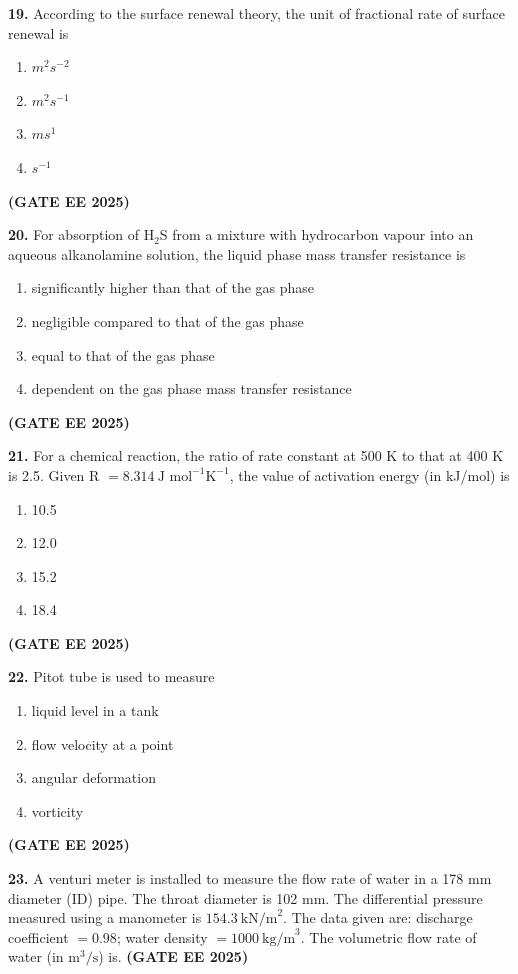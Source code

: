 \documentclass[journal,12pt,onecolumn]{IEEEtran}
\newcommand{\brak}[1]{(#1)}
\begin{document}
\noindent\textbf{19.} According to the surface renewal theory, the unit of fractional rate of surface renewal is
\begin{enumerate}
    \item $m^{2}s^{-2}$
    \item $m^{2}s^{-1}$
    \item $ms^{1}$
    \item $s^{-1}$
\end{enumerate}
\hfill \textbf{\brak{GATE EE 2025}}

\noindent\textbf{20.} For absorption of H$_2$S from a mixture with hydrocarbon vapour into an aqueous alkanolamine solution, the liquid phase mass transfer resistance is
\begin{enumerate}
    \item significantly higher than that of the gas phase
    \item negligible compared to that of the gas phase
    \item equal to that of the gas phase
    \item dependent on the gas phase mass transfer resistance
\end{enumerate}
\hfill \textbf{\brak{GATE EE 2025}}

\noindent\textbf{21.} For a chemical reaction, the ratio of rate constant at 500 K to that at 400 K is 2.5. Given R $=8.314~\text{J mol}^{-1}\text{K}^{-1}$, the value of activation energy \brak{in kJ/mol} is
\begin{enumerate}
    \item 10.5
    \item 12.0
    \item 15.2
    \item 18.4
\end{enumerate}
\hfill \textbf{\brak{GATE EE 2025}}

\noindent\textbf{22.} Pitot tube is used to measure
\begin{enumerate}
    \item liquid level in a tank
    \item flow velocity at a point
    \item angular deformation
    \item vorticity
\end{enumerate}
\hfill \textbf{\brak{GATE EE 2025}}

\noindent\textbf{23.} A venturi meter is installed to measure the flow rate of water in a 178 mm diameter \brak{ID} pipe. The throat diameter is 102 mm. The differential pressure measured using a manometer is $154.3~\text{kN/m}^{2}.$ The data given are: discharge coefficient $=0.98$; water density $=1000~\text{kg/m}^{3}$.
The volumetric flow rate of water \brak{in $\text{m}^{3}\text{/s}$} is\underline{\hspace{2cm}}.
\hfill \textbf{\brak{GATE EE 2025}}
\end{document}
